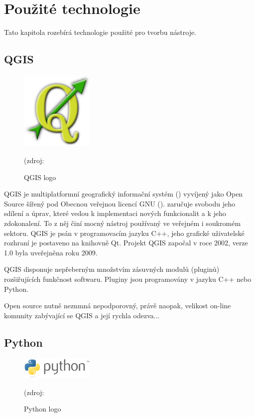 \chapter{Použité technologie}
\label{3-technologie}

Tato kapitola rozebírá technologie použité pro tvorbu nástroje.
\section{QGIS}

\begin{figure}[H]
    \centering
      \includegraphics[width=100pt]{./pictures/qgis.png}
      \caption[QGIS logo]{QGIS logo}(zdroj: %
      \label{fig:qgis}
  \end{figure}
 
QGIS je multiplatformní geografický informační systém () vyvíjený jako Open Source šířený pod Obecnou veřejnou licencí GNU ().  zaručuje svobodu jeho sdílení a úprav, které vedou k implementaci nových funkcionalit a k jeho zdokonalení. To z něj činí mocný nástroj používaný ve veřejném i soukromém sektoru. QGIS je psán v programovacím jazyku C++, jeho grafické uživatelské rozhraní je postaveno na knihovně Qt. Projekt QGIS započal v roce 2002, verze 1.0 byla uveřejněna roku 2009. 

QGIS disponuje nepřeberným množstvím zásuvných modulů (pluginů) rozšiřujících funkčnost softwaru. Pluginy jsou programovány v jazyku C++ nebo Python. 

Open source nutně neznmná nepodporovný, právě naopak, velikost on-line komunity zabývající se QGIS a její rychla odezva...



\section{Python}
\begin{figure}[H]
    \centering
      \includegraphics[width=100pt]{./pictures/python.png}
      \caption[Python logo]{Python logo}(zdroj: %
      \label{fig:python}
  \end{figure}
  
